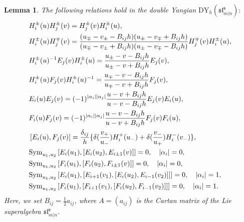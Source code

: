 \documentclass[a4paper,12pt]{article}
\newtheorem{lemm}[theo]{Lemma}
\numberwithin{equation}{section}
\begin{document}
\begin{lemm}\label{Drinfeld generator sl}
The following relations hold in the double Yangian $\mathrm{DY}_{h}(\mathfrak{sl}^{\mathfrak{s}}_{m|n}):$
\begin{align}\label{HiHj}
&H_{i}^{\pm}(u)H_{j}^{\pm}(v)=H_{j}^{\pm}(v)H_{i}^{\pm}(u),\\ \label{Hi+Hj-}
&H_{i}^{\pm}(u)H_{j}^{\mp}(v)=\frac{(u_{\mp}-v_{\pm}-B_{ij}h)(u_{\pm}-v_{\mp}+B_{ij}h)}{(u_{\mp}-v_{\pm}+B_{ij}h)(u_{\pm}-v_{\mp}-B_{ij}h)}H_{j}^{\mp}(v)H_{i}^{\pm}(u),\\ \label{HiEj}
&H_{i}^{\pm}(u)^{-1}E_{j}(v)H_{i}^{\pm}(u)=\frac{u_{\pm}-v-B_{ij}h}{u_{\pm}-v+B_{ij}h}E_{j}(v),\\ \label{HiFj}
&H_{i}^{\pm}(u)F_{j}(v)H_{i}^{\pm}(u)^{-1}=\frac{u_{\mp}-v-B_{ij}h}{u_{\mp}-v+B_{ij}h}F_{j}(v),\\ \label{EiEj}
&E_{i}(u)E_{j}(v)=(-1)^{|\alpha_{i}||\alpha_{j}|}\frac{u-v+B_{ij}h}{u-v-B_{ij}h}E_{j}(v)E_{i}(u),\\ \label{FiFj}
&F_{i}(u)F_{j}(v)=(-1)^{|\alpha_{i}||\alpha_{j}|}\frac{u-v-B_{ij}h}{u-v+B_{ij}h}F_{j}(v)F_{i}(u),\\ \label{EiFj}
&\left[E_{i}(u),F_{j}(v)\right]=\frac{\delta_{ij}}{h}\{\delta(\frac{v_{+}}{u_{-}})H_{i}^{+}(u_{-})+\delta(\frac{v_{-}}{u_{+}})H_{i}^{-}(v_{-})\},\\ \label{serre E1}
&{\rm Sym}_{u_{1},u_{2}}\left[E_{i}(u_{1}),\left[E_{i}(u_{2}),E_{i\pm 1}(v)\right]\right]=0,\quad |\alpha_{i}|=0,\\ \label{serre F1}
&{\rm Sym}_{u_{1},u_{2}}\left[F_{i}(u_{1}),\left[F_{i}(u_{2}),F_{i\pm 1}(v)\right]\right]=0,\quad |\alpha_{i}|=0,\\ \label{serre E2}
&{\rm Sym}_{u_{1},u_{2}}\left[E_{i}(u_{1}),\left[E_{i+1}(v_{1}),\left[E_{i}(u_{2}),
E_{i-1}(v_{2})\right]\right]\right]=0,\quad |\alpha_{i}|=1,\\ \label{serre F2}
&{\rm Sym}_{u_{1},u_{2}}\left[F_{i}(u_{1}),\left[F_{i+1}(v_{1}),\left[F_{i}(u_{2}),
F_{i-1}(v_{2})\right]\right]\right]=0,\quad |\alpha_{i}|=1.
\end{align}
Here, we set $B_{ij}=\frac{1}{2}a_{ij}$, where $A=(a_{ij})$ is the Cartan matrix of the Lie superalgebra $\mathfrak{sl}^{\mathfrak{s}}_{m|n}$.
\end{lemm}
\end{document}
